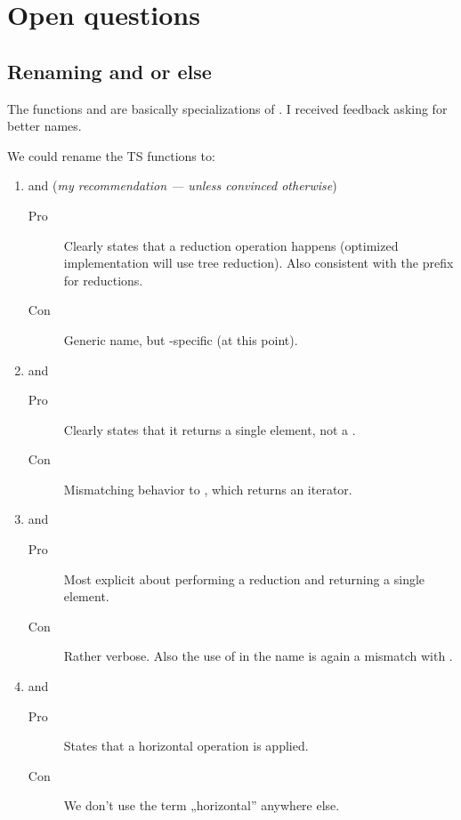 \section{Open questions}

\subsection{Renaming  and  or else}\label{sec:hminhmax}
The functions  and  are basically
specializations of .
I received feedback asking for better names.

We could rename the TS functions to:
\begin{enumerate}
  \item {} and  (\emph{my
        recommendation --- unless convinced otherwise})
    \begin{description}
      \item[Pro] Clearly states that a reduction operation happens (optimized
        implementation will use tree reduction). Also consistent with the
         prefix for \mask reductions.
      \item[Con] Generic name, but \simd-specific (at this point).
    \end{description}

  \item {} and 
    \begin{description}
      \item[Pro] Clearly states that it returns a single element, not a \simd.
      \item[Con] Mismatching behavior to \stdranges{}, which
        returns an iterator.
    \end{description}

  \item {} and 
    \begin{description}
      \item[Pro] Most explicit about performing a reduction and returning a
        single element.
      \item[Con] Rather verbose. Also the use of  in the name
        is again a mismatch with \stdranges{}.
    \end{description}

  \item {} and 
    \begin{description}
      \item[Pro] States that a horizontal operation is applied.
      \item[Con] We don't use the term „horizontal'' anywhere else.
    \end{description}


\end{enumerate}
